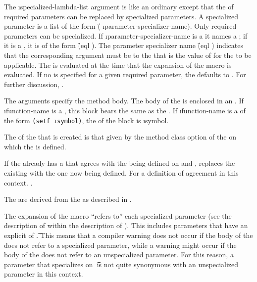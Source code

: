 The \i{specialized-lambda-list} argument is like an ordinary
 except that the  of required parameters can
be replaced by specialized parameters.  A specialized parameter is a
list of the form 
\f{( \i{parameter-specializer-name})}.
Only required parameters can be
specialized.  If \i{parameter-specializer-name} is a  it names a
; if it is a ,
it is of the form \f{(eql )}.  The parameter
specializer name \f{(eql )} indicates
that the corresponding argument must be  to the  that
is the value of  for the  to be applicable.  
The  is evaluated at the time
that the expansion of the  macro is evaluated.  
If no  is specified for a given
required parameter, the  defaults to 
.
For further discussion, \seesection\IntroToMethods.
 
The  arguments specify the method body.
The body of the  is enclosed in an .  If
\i{function-name} is a , 
this block bears the same  as the .  
If \i{function-name} is a  of the form 
{\tt (setf \i{symbol})}, the  of the block is \i{symbol}.  
 
The  of the   that is created is that given by the 
method class option of the  
on which the  is defined.
 
If the  already has a  that agrees with the
 being defined on  and ,
 replaces the existing  with the one now being
defined.
For a definition of agreement in this context.
\seesection\SpecializerQualifierAgreement.
 
The  are derived from 
the  as described in
\secref\IntroToMethods.

The expansion of the  macro ``refers to'' each
specialized parameter (see the description of  
within the description of ).
This includes parameters that
have an explicit  of \t.  This means
that a compiler warning does not occur if the body of the  does
not refer to a specialized parameter, while a warning might occur
if the body of the  does not refer to an unspecialized parameter.
For this reason, a parameter that specializes on \t\ is not quite synonymous
with an unspecialized parameter in this context.
 
